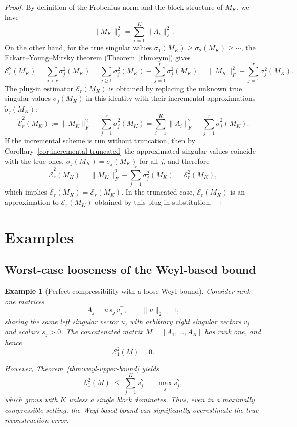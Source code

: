 \documentclass[10pt]{article} %
\newtheorem{example}{Example}
\begin{document}
\label{appendix:proof-inc-cor}

\begin{proof}
By definition of the Frobenius norm and the block structure of $M_K$, we have
\[
  \|M_K\|_F^2 = \sum_{i=1}^K \|A_i\|_F^2.
\]
On the other hand, for the true singular values
$\sigma_1(M_K)\ge\sigma_2(M_K)\ge\cdots$, the Eckart--Young--Mirsky theorem
(Theorem~\ref{thm:eym}) gives
\[
  \mathcal{E}_r^2(M_K)
  = \sum_{j>r} \sigma_j^2(M_K)
  = \sum_{j\ge 1} \sigma_j^2(M_K) - \sum_{j=1}^r \sigma_j^2(M_K)
  = \|M_K\|_F^2 - \sum_{j=1}^r \sigma_j^2(M_K).
\]
The plug-in estimator $\widetilde{\mathcal{E}}_r(M_K)$ is obtained by
replacing the unknown true singular values $\sigma_j(M_K)$ in this identity
with their incremental approximations $\widetilde{\sigma}_j(M_K)$:
\[
  \widetilde{\mathcal{E}}_r^2(M_K)
  := \|M_K\|_F^2 - \sum_{j=1}^r \widetilde{\sigma}_j^2(M_K)
  = \sum_{i=1}^K \|A_i\|_F^2 - \sum_{j=1}^r \widetilde{\sigma}_j^2(M_K).
\]
If the incremental scheme is run without truncation, then by
Corollary~\ref{cor:incremental-truncated} the approximated singular values
coincide with the true ones,
$\widetilde{\sigma}_j(M_K) = \sigma_j(M_K)$ for all $j$, and therefore
\[
  \widetilde{\mathcal{E}}_r^2(M_K)
  = \|M_K\|_F^2 - \sum_{j=1}^r \sigma_j^2(M_K)
  = \mathcal{E}_r^2(M_K),
\]
which implies $\widetilde{\mathcal{E}}_r(M_K) = \mathcal{E}_r(M_K)$.
In the truncated case, $\widetilde{\mathcal{E}}_r(M_K)$ is an approximation
to $\mathcal{E}_r(M_K)$ obtained by this plug-in substitution.
\end{proof}


\section{Examples}

\subsection{Worst-case looseness of the Weyl-based bound}
\label{app:weyl_example}

\begin{example}[Perfect compressibility with a loose Weyl bound]
Consider rank-one matrices
\[
A_j = u\, s_j\, v_j^\top, \qquad \|u\|_2 = 1,
\]
sharing the same left singular vector $u$, with arbitrary right singular vectors $v_j$ and scalars $s_j>0$.
The concatenated matrix $M = [A_1, \dots, A_K]$ has rank one, and hence
\[
\mathcal{E}_1^2(M) = 0.
\]

However, Theorem~\ref{thm:weyl-upper-bound} yields
\[
\mathcal{E}_1^2(M) \;\le\; \sum_{j=1}^K s_j^2 \;-\; \max_j s_j^2,
\]
which grows with $K$ unless a single block dominates.
Thus, even in a maximally compressible setting, the Weyl-based bound can significantly overestimate the true reconstruction error.
\end{example}
\end{document}
